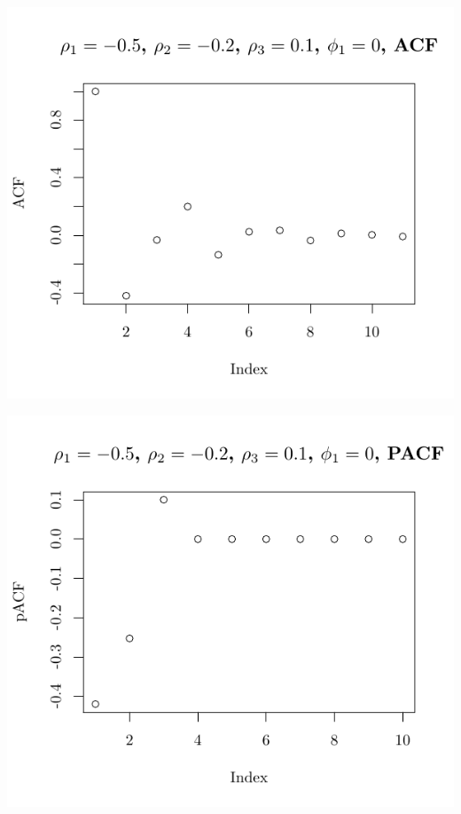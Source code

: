 \documentclass[10pt]{paper}\usepackage[]{graphicx}\usepackage[]{color}
\makeatletter
\def\maxwidth{ %
  \ifdim\Gin@nat@width>\linewidth
    \linewidth
  \else
    \Gin@nat@width
  \fi
}
\newenvironment{knitrout}{}{} %
\makeatother
\begin{document}
\begin{knitrout}
{\centering \includegraphics[width=\maxwidth]{figure/graphics-plotter-99} 

}




{\centering \includegraphics[width=\maxwidth]{figure/graphics-plotter-100} 

}





\end{knitrout}
\end{document}
